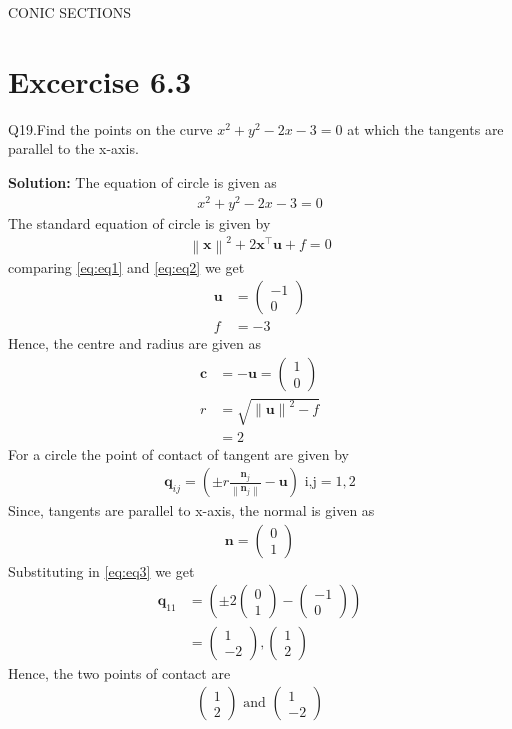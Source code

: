 \documentclass[12pt]{article}
\providecommand{\brak}[1]{\ensuremath{\left(#1\right)}}
\providecommand{\norm}[1]{\left\lVert#1\right\rVert}
\newcommand{\solution}{\noindent \textbf{Solution: }}
\newcommand{\myvec}[1]{\ensuremath{\begin{pmatrix}#1\end{pmatrix}}}
\let\vec\mathbf
\begin{document}
\begin{center}
\textbf\large{CONIC SECTIONS}

\end{center}
\section*{Excercise 6.3}
Q19.Find the points on the curve $x^2+y^2-2x-3=0$ at which the tangents are parallel to the x-axis.

\solution
The equation of circle is given as
\begin{align}
	\label{eq:eq1}
	x^2 + y^2 -2x -3 = 0
\end{align}
The standard equation of circle is given by
\begin{align}
	\label{eq:eq2}
	\norm{\vec{x}}^2+2\vec{x}^\top\vec{u}+f=0
\end{align}
comparing \eqref{eq:eq1} and \eqref{eq:eq2} we get
\begin{align}
	\vec{u} &= \myvec{-1\\0}\\
	f &= -3
\end{align}
Hence, the centre and radius are given as
\begin{align}
	\vec{c} &= -\vec{u} = \myvec{1\\0}\\
	r &= \sqrt{\norm{\vec{u}}^2 - f}\\
	  &= 2
\end{align}
For a circle the point of contact of tangent are given by
\begin{align}
	\label{eq:eq3}
	\vec{q}_{ij} = \brak{\pm r\frac{\vec{n}_j}{\norm{\vec{n}_j}}-\vec{u}} \text{ i,j} = 1,2
\end{align}
Since, tangents are parallel to x-axis, the normal is given as
\begin{align}
	\vec{n} = \myvec{0\\1}
\end{align}
Substituting in \eqref{eq:eq3} we get
\begin{align}
	\vec{q}_{11} &= \brak{\pm 2\myvec{0\\1} - \myvec{-1\\0}}\\
	&= \myvec{1\\-2},\myvec{1\\2}
\end{align}
Hence, the two points of contact are
\begin{align}
	\myvec{1\\2} \text{ and } \myvec{1\\-2}
\end{align}
\end{document}
